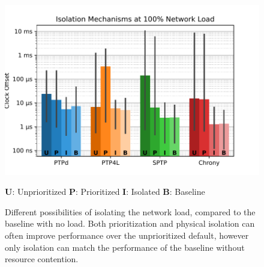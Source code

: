 \begin{figure}
    \includegraphics[width=\linewidth]{res/generated/net_isolation_comparison.pdf}
    \begin{center}
    \vspace{-0.5cm}
    \sffamily\scriptsize \textbf{U}: Unprioritized \quad\textbf{P}: Prioritized \quad\textbf{I}: Isolated \quad\textbf{B}: Baseline
    \end{center}
    \begin{center}
    \legend
    \end{center}
    \caption{Different possibilities of isolating the network load, compared to the baseline with no load. Both prioritization and physical isolation can often improve performance over the unprioritized default, however only isolation can match the performance of the baseline without resource contention.}
    \label{fig:net_isolation_comparison}
\end{figure}

